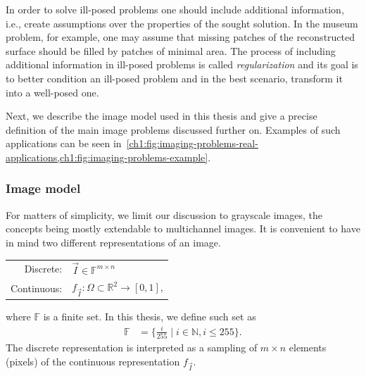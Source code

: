 In order to solve ill-posed problems one should include additional information, i.e., create assumptions over the properties of the sought solution. In the museum problem, for example, one may assume that missing patches of the reconstructed surface should be filled by patches of minimal area. The process of including additional information in ill-posed problems is called \emph{regularization} and its goal is to better condition an ill-posed problem and in the best scenario, transform it into a well-posed one. 

Next, we describe the image model used in this thesis and give a precise definition of the main image problems discussed further on. Examples of such applications can be seen in~\cref{ch1:fig:imaging-problems-real-applications,ch1:fig:imaging-problems-example}.

\subsubsection{Image model}
For matters of simplicity, we limit our discussion to grayscale images, the concepts being mostly extendable to multichannel images. It is convenient to have in mind two different representations of an image.
\begin{center}
\begin{tabular}{rl}
	Discrete: & $\vec{I} \in \mathbb{F}^{m \times n}$ \\
	Continuous: & $f_{\vec{I}}: \Omega \subset \mathbb{R}^2 \rightarrow [0,1]$,
\end{tabular}
\end{center}
%
where $\mathbb{F}$ is a finite set. In this thesis, we define such set as
\begin{align}
	\mathbb{F} &= \{ \frac{i}{255} \; | \; i \in \mathbb{N}, i \leq 255 \}.
\end{align}
%
The discrete representation is interpreted as a sampling of $m \times n$ elements (pixels) of the continuous representation $f_{\vec{I}}$. 

